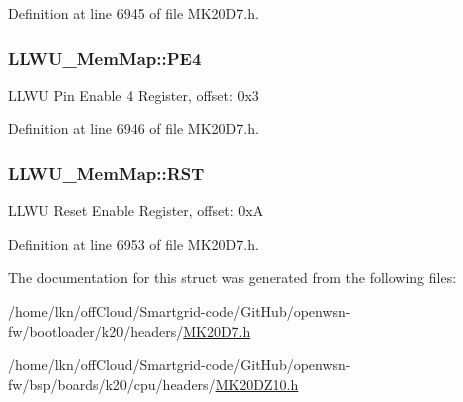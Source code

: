 Definition at line 6945 of file M\+K20\+D7.\+h.

\subsubsection[{\texorpdfstring{P\+E4}{PE4}}]{ L\+L\+W\+U\+\_\+\+Mem\+Map\+::\+P\+E4}\hypertarget{struct_l_l_w_u___mem_map_a61ec3534039e161c5c71ea7f290f23d5}{}\label{struct_l_l_w_u___mem_map_a61ec3534039e161c5c71ea7f290f23d5}
L\+L\+WU Pin Enable 4 Register, offset\+: 0x3 

Definition at line 6946 of file M\+K20\+D7.\+h.

\subsubsection[{\texorpdfstring{R\+ST}{RST}}]{ L\+L\+W\+U\+\_\+\+Mem\+Map\+::\+R\+ST}\hypertarget{struct_l_l_w_u___mem_map_a95c7e36f114e8ac7f235ad8ef335f1cf}{}\label{struct_l_l_w_u___mem_map_a95c7e36f114e8ac7f235ad8ef335f1cf}
L\+L\+WU Reset Enable Register, offset\+: 0xA 

Definition at line 6953 of file M\+K20\+D7.\+h.



The documentation for this struct was generated from the following files\+:\begin{DoxyCompactItemize}
\item 
/home/lkn/off\+Cloud/\+Smartgrid-\/code/\+Git\+Hub/openwsn-\/fw/bootloader/k20/headers/\hyperlink{bootloader_2k20_2headers_2_m_k20_d7_8h}{M\+K20\+D7.\+h}\item 
/home/lkn/off\+Cloud/\+Smartgrid-\/code/\+Git\+Hub/openwsn-\/fw/bsp/boards/k20/cpu/headers/\hyperlink{_m_k20_d_z10_8h}{M\+K20\+D\+Z10.\+h}\end{DoxyCompactItemize}
